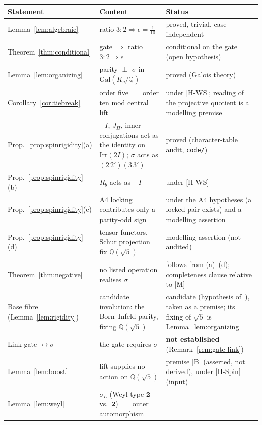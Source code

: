 \documentclass[11pt]{article}
\theoremstyle{definition}
\theoremstyle{remark}
\newcommand{\Gal}{\mathrm{Gal}}
\begin{document}
    \begin{center}
      \small
      \begin{tabular}{@{}p{}p{}p{}@{}}
        \hline
        Statement & Content & Status\\
        \hline
        Lemma~\ref{lem:algebraic} & ratio $3:2\Rightarrow\epsilon=\tfrac{1}{10}$ & proved, trivial, case-independent\\
        Theorem~\ref{thm:conditional} & gate $\Rightarrow$ ratio $3:2\Rightarrow\epsilon$ & conditional on the gate (open hypothesis)\\
        Lemma~\ref{lem:organizing} & parity $\perp$ $\sigma$ in $\Gal(K_q/\mathbb{Q})$ & proved (Galois theory)\\
        Corollary~\ref{cor:tiebreak} & order five $=$ order ten mod central lift
        & under [H-WS]; reading of the projective quotient is a modelling premise\\
        Prop.~\ref{prop:spinrigidity}(a) & $-I$, $J_\Pi$, inner conjugations act as the identity on $\mathrm{Irr}(2I)$; $\sigma$ acts as $(2\,2')(3\,3')$
        & proved (character-table audit, \texttt{code/})\\
        Prop.~\ref{prop:spinrigidity}(b) & $R_b$ acts as $-I$ & under [H-WS]\\
        Prop.~\ref{prop:spinrigidity}(c) & A4 locking contributes only a parity-odd sign
& under the A4 hypotheses (a locked pair exists) and a modelling assertion\\
        Prop.~\ref{prop:spinrigidity}(d) & tensor functors, Schur projection fix $\mathbb{Q}(\sqrt{5})$ & modelling assertion (not audited)\\
        Theorem~\ref{thm:negative} & no listed operation realises $\sigma$
        & follows from (a)--(d); completeness clause relative to [M]\\
        Base fibre (Lemma~\ref{lem:rigidity}) & candidate involution: the Born--Infeld parity, fixing $\mathbb{Q}(\sqrt{5})$
& candidate (hypothesis of~\cite{Beau2026m}), taken as a premise; its fixing of $\sqrt{5}$ is Lemma~\ref{lem:organizing}\\
Link gate $\leftrightarrow\sigma$ & the gate requires $\sigma$ & \textbf{not established} (Remark~\ref{rem:gate-link})\\
        Lemma~\ref{lem:boost} & lift supplies no action on $\mathbb{Q}(\sqrt{5})$ & premise [B] (asserted, not derived), under [H-Spin] (input)\\
        Lemma~\ref{lem:weyl} & $\sigma_L$ (Weyl type $\mathbf{2}$ vs.\ $\bar{\mathbf{2}}$) $\perp$ outer automorphism

\end{tabular}
\end{center}
\end{document}
